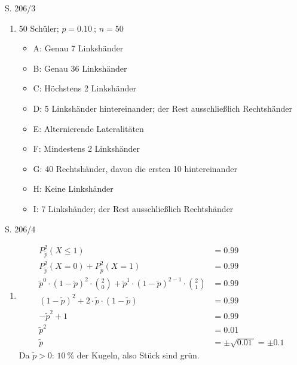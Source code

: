 \begin{Exercise}{S. 206/3}{}
\begin{enumerate}[leftmargin=*]
    \item [3.]{
        50 Schüler; \quad $p = \SI{0.10}{}$; \quad $n = 50$\\[-1.0ex]
        \begin{itemize}[leftmargin=*]
            \item A: Genau 7 Linkshänder
            \item B: Genau 36 Linkshänder
            \item C: Höchstens 2 Linkshänder
            \item D: 5 Linkshänder hintereinander; der Rest ausschließlich Rechtshänder
            \item E: Alternierende Lateralitäten
            \item F: Mindestens 2 Linkshänder
            \item G: 40 Rechtshänder, davon die ersten 10 hintereinander
            \item H: Keine Linkshänder
            \item I: 7 Linkshänder; der Rest ausschließlich Rechtshänder
        \end{itemize}
    }
\end{enumerate}
\end{Exercise}

\begin{Exercise}{S. 206/4}{}
\begin{enumerate}[leftmargin=*]
    \item [4.]{
        \begin{align*}
            P_{\tilde{p}}^{2} \left(X \leq 1\right) &= \SI{0.99}{}\\[1.5ex]
            P_{\tilde{p}}^{2} \left(X = 0\right) + P_{\tilde{p}}^{2} \left(X = 1\right) &= \SI{0.99}{}\\[1.5ex]
            \tilde{p}^{0} \cdot \left(1 - \tilde{p}\right)^{2} \cdot \binom{2}{0} + \tilde{p}^{1} \cdot \left(1 - \tilde{p}\right)^{2-1} \cdot \binom{2}{1} &= \SI{0.99}{}\\[1.5ex]
            \left(1 - \tilde{p}\right)^{2} + 2 \cdot \tilde{p} \cdot \left(1 - \tilde{p}\right) &= \SI{0.99}{}\\[1.5ex]
            -\tilde{p}^{2} + 1  &= \SI{0.99}{}\\[1.5ex]
            \tilde{p}^{2} &= \SI{0.01}{}\\[1.5ex]
            \tilde{p} &= \pm\sqrt{\SI{0.01}{}} = \pm\SI{0.1}{}
        \end{align*}
        Da $\tilde{p} > 0$: \quad $\SI{10}{\%}$ der Kugeln, also  Stück sind grün.
    }
\end{enumerate}
\end{Exercise}

